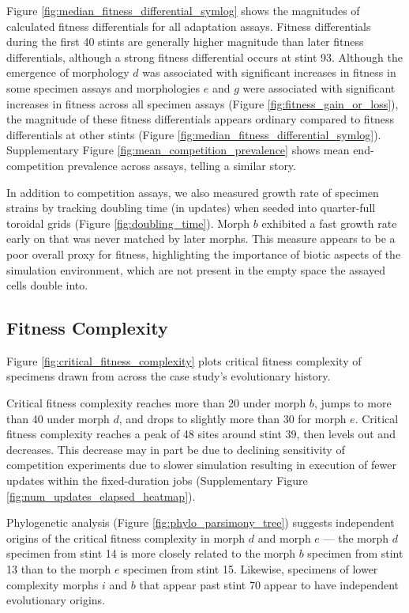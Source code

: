 Figure \ref{fig:median_fitness_differential_symlog} shows the magnitudes of calculated fitness differentials for all adaptation assays.
Fitness differentials during the first 40 stints are generally higher magnitude than later fitness differentials, although a strong fitness differential occurs at stint 93.
Although the emergence of morphology $d$ was associated with significant increases in fitness in some specimen assays and morphologies $e$ and $g$ were associated with significant increases in fitness across all specimen assays (Figure \ref{fig:fitness_gain_or_loss}), the magnitude of these fitness differentials appears ordinary compared to fitness differentials at other stints (Figure \ref{fig:median_fitness_differential_symlog}).
Supplementary Figure \ref{fig:mean_competition_prevalence} shows mean end-competition prevalence across assays, telling a similar story.



In addition to competition assays, we also measured growth rate of specimen strains by tracking doubling time (in updates) when seeded into quarter-full toroidal grids (Figure \ref{fig:doubling_time}).
Morph $b$ exhibited a fast growth rate early on that was never matched by later morphs.
This measure appears to be a poor overall proxy for fitness, highlighting the importance of biotic aspects of the simulation environment, which are not present in the empty space the assayed cells double into.


\subsection{Fitness Complexity}



Figure \ref{fig:critical_fitness_complexity} plots critical fitness complexity of specimens drawn from across the case study's evolutionary history.

Critical fitness complexity reaches more than 20 under morph $b$, jumps to more than 40 under morph $d$, and drops to slightly more than 30 for morph $e$.
Critical fitness complexity reaches a peak of 48 sites around stint 39, then levels out and decreases.
This decrease may in part be due to declining sensitivity of competition experiments due to slower simulation resulting in execution of fewer updates within the fixed-duration jobs (Supplementary Figure \ref{fig:num_updates_elapsed_heatmap}).

Phylogenetic analysis (Figure \ref{fig:phylo_parsimony_tree}) suggests independent origins of the critical fitness complexity in morph $d$ and morph $e$ --- the morph $d$ specimen from stint 14 is more closely related to the morph $b$ specimen from stint 13 than to the morph $e$ specimen from stint 15.
Likewise, specimens of lower complexity morphs $i$ and $b$ that appear past stint 70 appear to have independent evolutionary origins.

